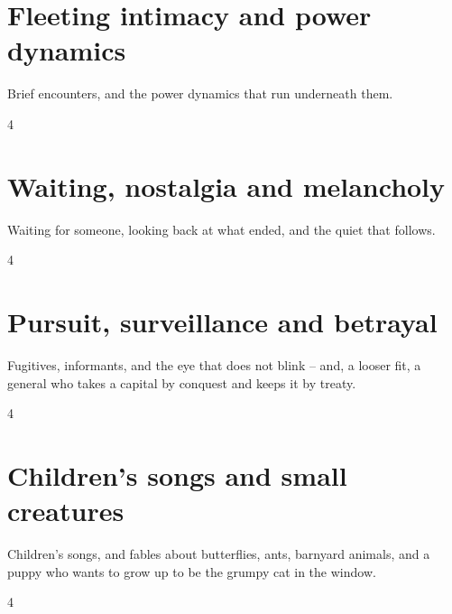 \documentclass[a4paper,landscape]{memoir}
\begin{document}
\chapter{Fleeting intimacy and power dynamics}
Brief encounters, and the power dynamics that run underneath them.
\clearpage\begin{multicols*}{4}











\end{multicols*}

\chapter{Waiting, nostalgia and melancholy}
Waiting for someone, looking back at what ended, and the quiet that follows.
\clearpage\begin{multicols*}{4}











\end{multicols*}

\chapter{Pursuit, surveillance and betrayal}
Fugitives, informants, and the eye that does not blink -- and, a looser fit, a general who takes a capital by conquest and keeps it by treaty.
\clearpage\begin{multicols*}{4}




\end{multicols*}

\chapter{Children's songs and small creatures}
Children's songs, and fables about butterflies, ants, barnyard animals, and a puppy who wants to grow up to be the grumpy cat in the window.
\clearpage\begin{multicols*}{4}









\end{multicols*}
\end{document}
